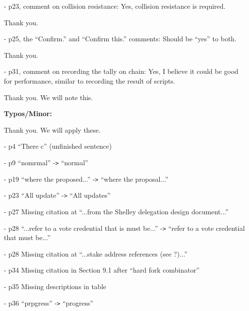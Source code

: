 \documentclass{article}
\begin{document}
\vspace{12pt}
- p23, comment on collision resistance: Yes, collision resistance is required.

\vspace{12pt}
{\color{color02} Thank you.}

\vspace{12pt}
- p25, the ``Confirm.'' and ``Confirm this.'' comments: Should be ``yes'' to both.

\vspace{12pt}
{\color{color02} Thank you.}

\vspace{12pt}
- p31, comment on recording the tally on chain: Yes, I believe it could be good 
for performance, similar to recording the result of scripts.

\vspace{12pt}
{\color{color02} Thank you.  We will note this.}

\vspace{12pt}
\begin{center}
\textbf{Typos/Minor:}
\end{center}

\baselineskip=12pt
\leftskip=0pt
{\color{color02} Thank you. We will apply these.}

\vspace{12pt}
- p4 ``There c'' (unfinished sentence)

\vspace{12pt}
- p9 ``nomrmal'' -\texttt{>} ``normal''

\vspace{12pt}
- p19 ``where the proposed...'' -\texttt{>} ``where the proposal...''

\vspace{12pt}
- p23 ``All update'' -\texttt{>} ``All updates''

\vspace{12pt}
- p27 Missing citation at ``...from the Shelley delegation design document...''

\vspace{12pt}
- p28 ``...refer to a vote credential that is must be...'' -\texttt{>} ``refer 
to a vote credential that must be...''

\vspace{12pt}
- p28 Missing citation at ``...stake address references (see ?)...''

\vspace{12pt}
- p34 Missing citation in Section 9.1 after ``hard fork combinator''

\vspace{12pt}
- p35 Missing descriptions in table

\vspace{12pt}
- p36 ``prpgress'' -\texttt{>} ``progress''

\newpage
\end{document}
